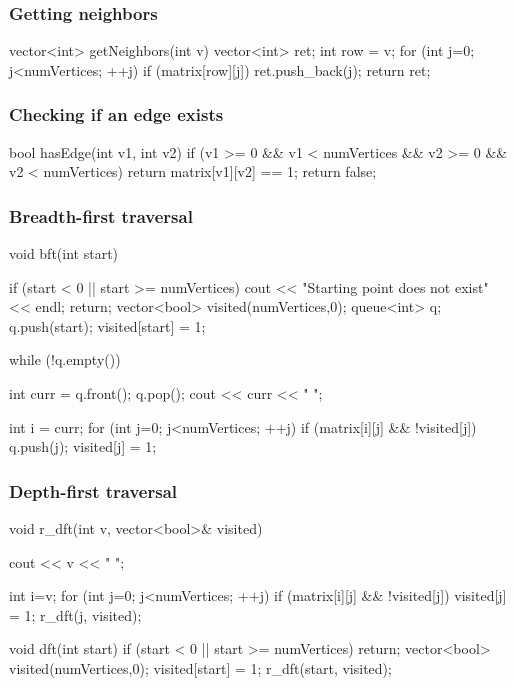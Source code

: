 \documentclass{report}
\begin{document}
\bigbreak \noindent 
\subsubsection{Getting neighbors}
\bigbreak \noindent 
\begin{cppcode}
    vector<int> getNeighbors(int v) {
        vector<int> ret{};
        int row = v; 
        for (int j=0; j<numVertices; ++j) {
            if (matrix[row][j]) ret.push_back(j);
        }
        return ret;
    }
\end{cppcode}

\bigbreak \noindent 
\subsubsection{Checking if an edge exists}
\bigbreak \noindent 
\begin{cppcode}
    bool hasEdge(int v1, int v2) {
        if (v1 >= 0 && v1 < numVertices && v2 >= 0 && v2 < numVertices) {
            return matrix[v1][v2] == 1;
        } 
        return false;
    }
\end{cppcode}

\pagebreak 
\subsubsection{Breadth-first traversal}
\bigbreak \noindent 
\begin{cppcode}
    void bft(int start) {
        if (start < 0 || start >= numVertices) {
            cout << "Starting point does not exist" << endl;
            return;
        }
        vector<bool> visited(numVertices,0);
        queue<int> q;
        q.push(start);
        visited[start] = 1;

        while (!q.empty()) {
            int curr = q.front();
            q.pop();
            cout << curr << " ";

            int i = curr;
            for (int j=0; j<numVertices; ++j) {
                if (matrix[i][j] && !visited[j]) {
                    q.push(j);
                    visited[j] = 1;
                }
            }
        }
    }
\end{cppcode}

\pagebreak 
\subsubsection{Depth-first traversal}
\bigbreak \noindent 
\begin{cppcode}
    void r_dft(int v, vector<bool>& visited) {
        cout << v << " ";

        int i=v;
        for (int j=0; j<numVertices; ++j) {
            if (matrix[i][j] && !visited[j]) {
                visited[j] = 1;
                r_dft(j, visited);
            }
        }
    }

    void dft(int start) {
        if (start < 0 || start >= numVertices) {
            return;
        }
        vector<bool> visited(numVertices,0);
        visited[start] = 1;
        r_dft(start, visited);
    }
\end{cppcode}
\end{document}

